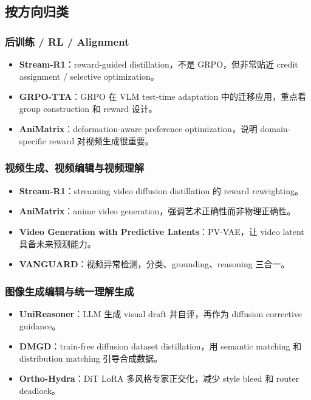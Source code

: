 \subsection{按方向归类}

\subsubsection{后训练 / RL / Alignment}

\begin{itemize}[leftmargin=1.5em]
  \item \textbf{Stream-R1}：reward-guided distillation，不是 GRPO，但非常贴近 credit assignment / selective optimization。
  \item \textbf{GRPO-TTA}：GRPO 在 VLM test-time adaptation 中的迁移应用，重点看 group construction 和 reward 设计。
  \item \textbf{AniMatrix}：deformation-aware preference optimization，说明 domain-specific reward 对视频生成很重要。
\end{itemize}

\subsubsection{视频生成、视频编辑与视频理解}

\begin{itemize}[leftmargin=1.5em]
  \item \textbf{Stream-R1}：streaming video diffusion distillation 的 reward reweighting。
  \item \textbf{AniMatrix}：anime video generation，强调艺术正确性而非物理正确性。
  \item \textbf{Video Generation with Predictive Latents}：PV-VAE，让 video latent 具备未来预测能力。
  \item \textbf{VANGUARD}：视频异常检测，分类、grounding、reasoning 三合一。
\end{itemize}

\subsubsection{图像生成编辑与统一理解生成}

\begin{itemize}[leftmargin=1.5em]
  \item \textbf{UniReasoner}：LLM 生成 visual draft 并自评，再作为 diffusion corrective guidance。
  \item \textbf{DMGD}：train-free diffusion dataset distillation，用 semantic matching 和 distribution matching 引导合成数据。
  \item \textbf{Ortho-Hydra}：DiT LoRA 多风格专家正交化，减少 style bleed 和 router deadlock。
\end{itemize}

